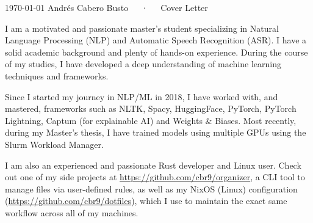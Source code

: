 \documentclass[11pt, a4paper]{awesome-cv}
\begin{document}
\makecvheader[R]

\makecvfooter
  {\today}
  {Andrés Cabero Busto~~~·~~~Cover Letter}
  {}

\makelettertitle

\begin{cvletter}

I am a motivated and passionate master's student specializing in Natural Language Processing (NLP) and Automatic Speech Recognition (ASR). I have a solid academic background and plenty of hands-on experience. During the course of my studies, I have developed a deep understanding of machine learning techniques and frameworks. 

Since I started my journey in NLP/ML in 2018, I have worked with, and mastered, frameworks such as NLTK, Spacy, HuggingFace, PyTorch, PyTorch Lightning, Captum (for explainable AI) and Weights \& Biases. Most recently, during my Master's thesis, I have trained models using multiple GPUs using the Slurm Workload Manager.

I am also an experienced and passionate Rust developer and Linux user. Check out one of my side projects at \url{https://github.com/cbr9/organizer}, a CLI tool to manage files via user-defined rules, as well as my NixOS (Linux) configuration (\url{https://github.com/cbr9/dotfiles}), which I use to maintain the exact same workflow across all of my machines.



\end{cvletter}
\end{document}
